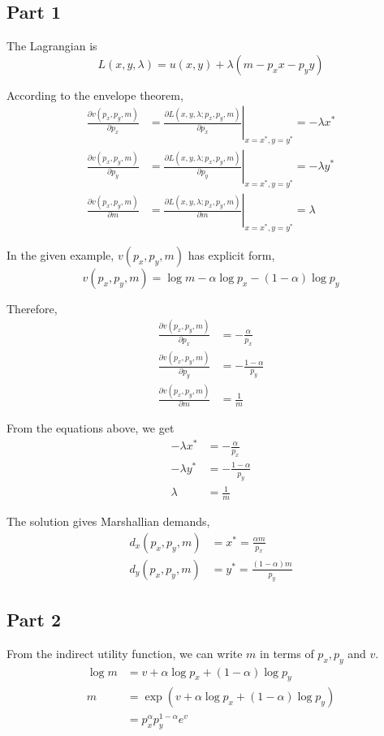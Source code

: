 \documentclass{article}
\begin{document}
\subsection{Part 1}
The Lagrangian is
\begin{equation*}
	L(x,y,\lambda)=u(x,y)+\lambda(m-p_xx-p_yy)
\end{equation*}

According to the envelope theorem,
\begin{align*}
	\frac{\partial v(p_x,p_y,m)}{\partial p_x}&=\left.\frac{\partial L(x,y,\lambda;p_x,p_y,m)}{\partial p_x}\right|_{x=x^*,y=y^*}=-\lambda x^*\\
	\frac{\partial v(p_x,p_y,m)}{\partial p_y}&=\left.\frac{\partial L(x,y,\lambda;p_x,p_y,m)}{\partial p_y}\right|_{x=x^*,y=y^*}=-\lambda y^*\\
	\frac{\partial v(p_x,p_y,m)}{\partial m}&=\left.\frac{\partial L(x,y,\lambda;p_x,p_y,m)}{\partial m}\right|_{x=x^*,y=y^*}=\lambda
\end{align*}

In the given example, $v(p_x,p_y,m)$ has explicit form,
\begin{equation*}
	v(p_x,p_y,m)=\log m-\alpha\log p_x-(1-\alpha)\log p_y
\end{equation*}

Therefore,
\begin{align*}
	\frac{\partial v(p_x,p_y,m)}{\partial p_x}&=-\frac{\alpha}{p_x}\\
	\frac{\partial v(p_x,p_y,m)}{\partial p_y}&=-\frac{1-\alpha}{p_y}\\
	\frac{\partial v(p_x,p_y,m)}{\partial m}&=\frac{1}{m}
\end{align*}

From the equations above, we get
\begin{align*}
	-\lambda x^*&=-\frac{\alpha}{p_x}\\
	-\lambda y^*&=-\frac{1-\alpha}{p_y}\\
	\lambda&=\frac{1}{m}
\end{align*}

The solution gives Marshallian demands,
\begin{align*}
	d_x(p_x,p_y,m)&=x^*=\frac{\alpha m}{p_x}\\
	d_y(p_x,p_y,m)&=y^*=\frac{(1-\alpha)m}{p_y}
\end{align*}

\subsection{Part 2}
From the indirect utility function, we can write $m$ in terms of $p_x,p_y$ and $v$.
\begin{align*}
	\log m&=v+\alpha\log p_x+(1-\alpha)\log p_y\\
	m&=\exp(v+\alpha\log p_x+(1-\alpha)\log p_y)\\
	&=p_x^\alpha p_y^{1-\alpha}e^v
\end{align*}
\end{document}

